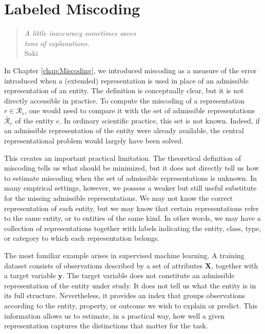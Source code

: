 %
%


\chapter{Labeled Miscoding}
\label{chap:Labeled_Miscoding}

\begin{quote}
\begin{flushright}
\emph{A little inaccuracy sometimes saves\\
tons of explanations.}\\
Saki
\end{flushright}
\end{quote}
\bigskip

In Chapter \ref{chap:Miscoding}, we introduced miscoding as a measure of the error introduced when a (extended) representation is used in place of an admissible representation of an entity. The definition is conceptually clear, but it is not directly accessible in practice. To compute the miscoding of a representation $r \in \mathcal{R}_e$, one would need to compare it with the set of admissible representations $\bar{\mathcal R}_e$ of the entity $e$. In ordinary scientific practice, this set is not known. Indeed, if an admissible representation of the entity were already available, the central representational problem would largely have been solved.

This creates an important practical limitation. The theoretical definition of miscoding tells us what should be minimized, but it does not directly tell us how to estimate miscoding when the set of admissible representations is unknown. In many empirical settings, however, we possess a weaker but still useful substitute for the missing admissible representations. We may not know the correct representation of each entity, but we may know that certain representations refer to the same entity, or to entities of the same kind. In other words, we may have a collection of representations together with labels indicating the entity, class, type, or category to which each representation belongs.

The most familiar example arises in supervised machine learning. A training dataset consists of observations described by a set of attributes $\mathbf{X}$, together with a target variable $\mathbf{y}$. The target variable does not constitute an admissible representation of the entity under study. It does not tell us what the entity is in its full structure. Nevertheless, it provides an index that groups observations according to the entity, property, or outcome we wish to explain or predict. This information allows us to estimate, in a practical way, how well a given representation captures the distinctions that matter for the task.

